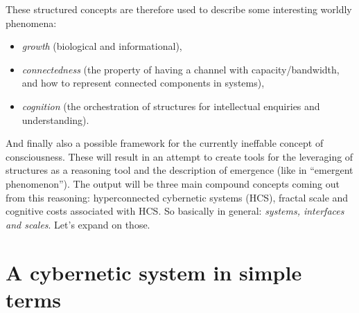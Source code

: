 \documentclass[14pt]{extarticle}
\begin{document}
These structured concepts are therefore used to describe some interesting worldly phenomena:

\begin{itemize}
\item \textit{growth} (biological and informational),
\item \textit{connectedness} (the property of having a channel with capacity/bandwidth, and how to represent connected components in systems), 
\item \textit{cognition} (the orchestration of structures for intellectual enquiries and understanding).
\end{itemize}
And finally also a possible framework for the currently ineffable concept of consciousness.
These will result in an attempt to create tools for the leveraging of structures as a reasoning tool and the description of emergence (like in “emergent phenomenon”). The output will be three main compound concepts coming out from this reasoning: hyperconnected cybernetic systems (HCS), fractal scale and cognitive costs associated with HCS. So basically in general: \textit{systems, interfaces and scales}. Let’s expand on those.

\section*{A cybernetic system in simple terms}
\label{sec:cybernetics}
\end{document}
